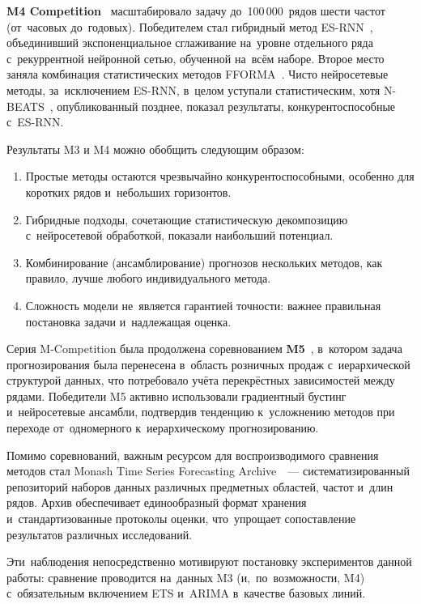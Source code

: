 \textbf{M4 Competition}~\cite{makridakis2020m4} масштабировало задачу
до~100\,000~рядов шести частот (от~часовых до~годовых).  Победителем
стал гибридный метод ES-RNN~\cite{smyl2020hybrid}, объединивший
экспоненциальное сглаживание на~уровне отдельного ряда с~рекуррентной
нейронной сетью, обученной на~всём наборе.  Второе место заняла
комбинация статистических методов FFORMA~\cite{monteromanso2020fforma}.
Чисто нейросетевые методы, за~исключением ES-RNN, в~целом уступали
статистическим, хотя N-BEATS~\cite{oreshkin2020nbeats}, опубликованный
позднее, показал результаты, конкурентоспособные с~ES-RNN.

Результаты M3 и M4 можно обобщить следующим образом:
\begin{enumerate}[nosep]
\item Простые методы остаются чрезвычайно конкурентоспособными,
   особенно для коротких рядов и~небольших горизонтов.
\item Гибридные подходы, сочетающие статистическую декомпозицию
   с~нейросетевой обработкой, показали наибольший потенциал.
\item Комбинирование (ансамблирование) прогнозов нескольких методов,
   как правило, лучше любого индивидуального метода.
\item Сложность модели не~является гарантией точности: важнее
   правильная постановка задачи и~надлежащая оценка.
\end{enumerate}

Серия M-Competition была продолжена соревнованием
\textbf{M5}~\cite{makridakis2022m5}, в~котором задача прогнозирования
была перенесена в~область розничных продаж с~иерархической структурой
данных, что потребовало учёта перекрёстных зависимостей между рядами.
Победители M5 активно использовали градиентный бустинг и~нейросетевые
ансамбли, подтвердив тенденцию к~усложнению методов при переходе
от~одномерного к~иерархическому прогнозированию.

Помимо соревнований, важным ресурсом для воспроизводимого сравнения
методов стал Monash Time Series Forecasting
Archive~\cite{godahewa2021monash}~--- систематизированный репозиторий
наборов данных различных предметных областей, частот и~длин рядов.
Архив обеспечивает единообразный формат хранения и~стандартизованные
протоколы оценки, что~упрощает сопоставление результатов различных
исследований.

Эти~наблюдения непосредственно мотивируют постановку экспериментов
данной работы: сравнение проводится на~данных M3 (и,~по~возможности,
M4) с~обязательным включением ETS и~ARIMA в~качестве базовых линий.


